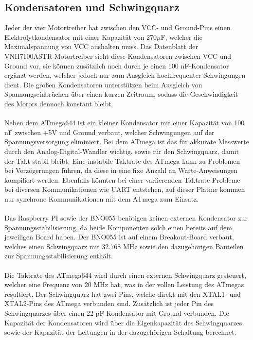 \documentclass[12pt]{article}
\begin{document}
\subsection{Kondensatoren und Schwingquarz}
Jeder der vier Motortreiber hat zwischen den VCC- und Ground-Pins einen Elektrolytkondensator mit einer Kapazität von 270$\mu$F, welcher die Maximalspannung von VCC aushalten muss. Das Datenblatt der VNH7100ASTR-Motortreiber sieht diese Kondensatoren zwischen VCC und Ground vor, sie können zusätzlich noch durch je einen 100 nF-Kondensator ergänzt werden, welcher jedoch nur zum Ausgleich hochfrequenter Schwingungen dient. Die großen Kondensatoren unterstützen beim Ausgleich von Spannungseinbrüchen über einen kurzen Zeitraum, sodass die Geschwindigkeit des Motors dennoch konstant bleibt. 
\\\\Neben dem ATmega644 ist ein kleiner Kondensator mit einer Kapazität von 100 nF zwischen +5V und Ground verbaut, welcher Schwingungen auf der Spannungsversorgung eliminiert. Bei dem ATmega ist das für akkurate Messwerte durch den Analog-Digital-Wandler wichtig, sowie für den Schwingquarz, damit der Takt stabil bleibt. Eine instabile Taktrate des ATmega kann zu Problemen bei Verzögerungen führen, da diese in eine fixe Anzahl an Warte-Anweisungen kompiliert werden. Ebenfalls könnten bei einer variierenden Taktrate Probleme bei diversen Kommunikationen wie UART entstehen, auf dieser Platine kommen nur synchrone Kommunikationen mit dem ATmega zum Einsatz.
\\\\Das Raspberry PI sowie der BNO055 benötigen keinen externen Kondensator zur Spannungsstabilisierung, da beide Komponenten solch einen bereits auf dem jeweiligen Board haben. Der BNO055 ist auf einem Breakout-Board verbaut, welches einen Schwingquarz mit 32.768 MHz sowie den dazugehörigen Bauteilen zur Spannungsstabilisierung enthält.
\\\\Die Taktrate des ATmega644 wird durch einen externen Schwingquarz gesteuert, welcher eine Frequenz von 20 MHz hat, was in der vollen Leistung des ATmegas resultiert. Der Schwingquarz hat zwei Pins, welche direkt mit den XTAL1- und XTAL2-Pins des ATmega verbunden sind. Zusätzlich ist jeder Pin des Schwingquarzes über einen 22 pF-Kondensator mit Ground verbunden. Die Kapazität der Kondensatoren wird über die Eigenkapazität des Schwingquarzes sowie der Kapazität der Leitungen in der dazugehörigen Schaltung berechnet.
\end{document}
